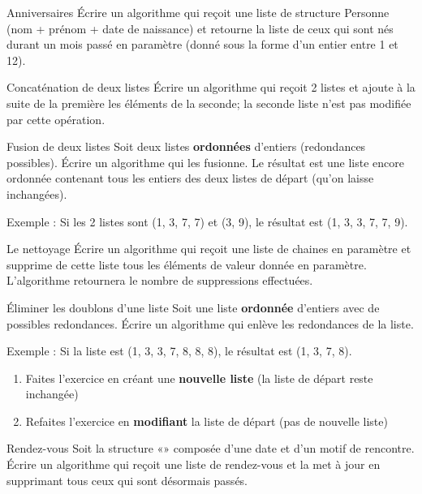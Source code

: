 		\begin{Exercice}{Anniversaires}
				Écrire un algorithme qui reçoit une liste de structure Personne 
				(nom + prénom + date de naissance) et retourne la liste
				de ceux qui sont nés durant un mois passé en paramètre 
				(donné sous la forme d'un entier entre 1 et 12).
		\end{Exercice}
			
		\begin{Exercice}{Concaténation de deux listes}
				Écrire un algorithme qui reçoit 2 listes et ajoute
				à la suite de la première les éléments de la seconde; la seconde liste
				n'est pas modifiée par cette opération.
		\end{Exercice}
		
		\begin{Exercice}{Fusion de deux listes}
				Soit deux listes \textbf{ordonnées}
				d'entiers (redondances possibles). Écrire un algorithme
				qui les fusionne. Le résultat est une liste encore ordonnée contenant
				tous les entiers des deux listes de départ (qu'on
				laisse inchangées).
		
				Exemple : Si les 2 listes sont (1, 3, 7, 7) et (3, 9), 
				le résultat est (1, 3, 3, 7, 7, 9).
		\end{Exercice}
		
		\begin{Exercice}{Le nettoyage}
			Écrire un algorithme qui reçoit une liste de chaines en paramètre et
			supprime de cette liste tous les éléments de valeur donnée en
			paramètre. L'algorithme retournera le nombre de
			suppressions effectuées.
		\end{Exercice}
		
		\begin{Exercice}{Éliminer les doublons d'une liste}
				Soit une liste \textbf{ordonnée} 
				d'entiers avec de possibles redondances. Écrire un
				algorithme qui enlève les redondances de la liste.
						
				Exemple : Si la liste est (1, 3, 3, 7, 8, 8, 8),
				le résultat est (1, 3, 7, 8).
		
				\begin{enumerate}[label=\alph*)]
					\item 
						Faites l'exercice en créant une \textbf{nouvelle
						liste} (la liste de départ reste inchangée)
					\item 
						Refaites l'exercice en \textbf{modifiant}
						la liste de départ (pas de nouvelle liste)
				\end{enumerate}
		\end{Exercice}
				
		\begin{Exercice}{Rendez-vous}
			Soit la structure «» composée d’une date
			et d’un motif de rencontre. Écrire un algorithme qui reçoit une liste de
			rendez-vous et la met à jour en supprimant tous ceux qui sont désormais
			passés. 
		\end{Exercice}
		
	
